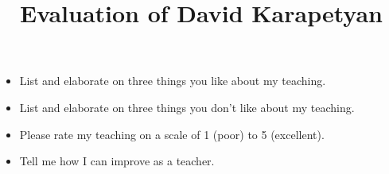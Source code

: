 \documentclass[12pt]{article}
\begin{document}
\title{ \large{
Evaluation of David Karapetyan \\
}}
\author{}
\date{}
\maketitle
\thispagestyle{empty}
\begin{itemize}

	\item List and elaborate on three things you like about my teaching.
		\vspace{4cm}

	\item List and elaborate on three things you don't like about my teaching.
		\vspace{4cm}

	\item Please rate my teaching on a scale of 1 (poor) to 5 (excellent).
		\vspace{4cm}


	\item Tell me how I can improve as a teacher. 
\end{itemize}
\end{document}
